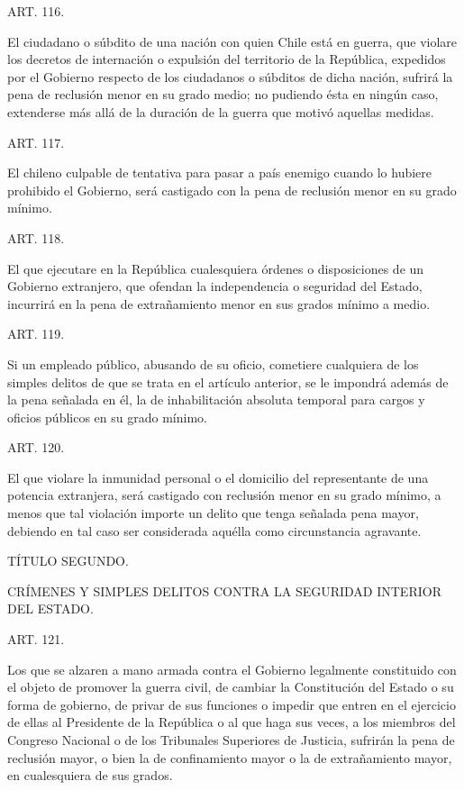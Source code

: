     ART. 116.

    El ciudadano o súbdito de una nación con quien Chile está en guerra, que violare los decretos de internación o expulsión del territorio de la República, expedidos por el Gobierno respecto de los ciudadanos o súbditos de dicha nación, sufrirá la pena de reclusión menor en su grado medio; no pudiendo ésta en ningún caso, extenderse más allá de la duración de la guerra que motivó aquellas medidas.


    ART. 117.

    El chileno culpable de tentativa para pasar a país enemigo cuando lo hubiere prohibido el Gobierno, será castigado con la pena de reclusión menor en su grado mínimo.


    ART. 118.

    El que ejecutare en la República cualesquiera órdenes o disposiciones de un Gobierno extranjero, que ofendan la independencia o seguridad del Estado, incurrirá en la pena de extrañamiento menor en sus grados mínimo a medio.


    ART. 119.

    Si un empleado público, abusando de su oficio, cometiere cualquiera de los simples delitos de que se trata en el artículo anterior, se le impondrá además de la pena señalada en él, la de inhabilitación absoluta temporal para cargos y oficios públicos en su grado mínimo.


    ART. 120.

    El que violare la inmunidad personal o el domicilio del representante de una potencia extranjera, será castigado con reclusión menor en su grado mínimo, a menos que tal violación importe un delito que tenga señalada pena mayor, debiendo en tal caso ser considerada aquélla como circunstancia agravante.


    TÍTULO SEGUNDO.

    CRÍMENES Y SIMPLES DELITOS CONTRA LA SEGURIDAD INTERIOR DEL ESTADO.








    ART. 121.

    Los que se alzaren a mano armada contra el Gobierno legalmente constituido con el objeto de promover la guerra civil, de cambiar la Constitución del Estado o su forma de gobierno, de privar de sus funciones o impedir que entren en el ejercicio de ellas al Presidente de la República o al que haga sus veces, a los miembros del Congreso Nacional o de los Tribunales Superiores de Justicia, sufrirán la pena de reclusión mayor, o bien la de confinamiento mayor o la de extrañamiento mayor, en cualesquiera de sus grados.


